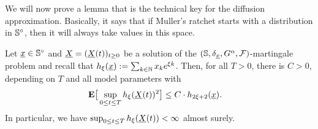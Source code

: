 \noindent
We will now prove a lemma that is the technical key for the diffusion approximation.
Basically, it says that if Muller's ratchet starts with a distribution in
$\mathbb{S}^\circ$, then it will always take values in this space.

\begin{Lemma}\label{da:l:expBounds}
Let $\underline{x} \in \mathbb{S}^\circ$ and $\underline{X} =
(\underline{X} \! \left( t \right))_{t\geq 0}$ be a solution of the $(\mathbb{S},
\delta_{\underline{x}},G^{\alpha}, \mathcal{F})$-martingale
problem and recall that $h_\xi(\underline{x}):=\sum_{k \in \mathbb{N}} x_k e^{\xi k}$. Then, for all $T>0$,
there is $C>0$, depending on $T$ and all model parameters with
\begin{align}\label{da:eq:expBounds1}
  \mathbf E\big[ & \sup_{0\leq t\leq T} h_\xi(\underline{X} \! \left( t \right))^2\big] \leq C \cdot
  h_{2\xi+2}(\underline{x}).
\end{align}
In particular, we have $\sup_{0\leq t\leq T} h_\xi(\underline{X} \! \left( t \right)) < \infty$ almost
surely.
\end{Lemma}

